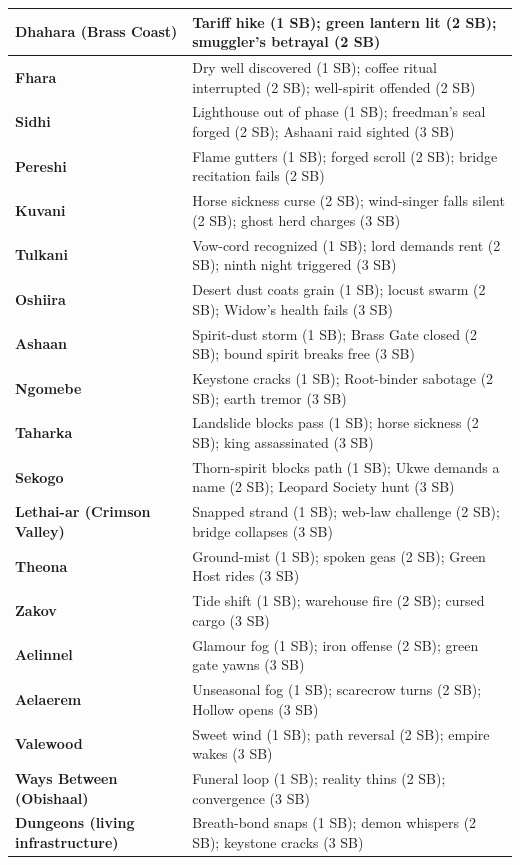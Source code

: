 \documentclass[11pt,letterpaper,twoside]{book}
\begin{document}
\begin{longtable}{|p{3cm}|p{9cm}|}
\hline
\textbf{Dhahara (Brass Coast)} & Tariff hike (1 SB); green lantern lit (2 SB); smuggler's betrayal (2 SB) \\
\hline
\textbf{Fhara} & Dry well discovered (1 SB); coffee ritual interrupted (2 SB); well-spirit offended (2 SB) \\
\hline
\textbf{Sidhi} & Lighthouse out of phase (1 SB); freedman's seal forged (2 SB); Ashaani raid sighted (3 SB) \\
\hline
\textbf{Pereshi} & Flame gutters (1 SB); forged scroll (2 SB); bridge recitation fails (2 SB) \\
\hline
\textbf{Kuvani} & Horse sickness curse (2 SB); wind-singer falls silent (2 SB); ghost herd charges (3 SB) \\
\hline
\textbf{Tulkani} & Vow-cord recognized (1 SB); lord demands rent (2 SB); ninth night triggered (3 SB) \\
\hline
\textbf{Oshiira} & Desert dust coats grain (1 SB); locust swarm (2 SB); Widow's health fails (3 SB) \\
\hline
\textbf{Ashaan} & Spirit-dust storm (1 SB); Brass Gate closed (2 SB); bound spirit breaks free (3 SB) \\
\hline
\textbf{Ngomebe} & Keystone cracks (1 SB); Root-binder sabotage (2 SB); earth tremor (3 SB) \\
\hline
\textbf{Taharka} & Landslide blocks pass (1 SB); horse sickness (2 SB); king assassinated (3 SB) \\
\hline
\textbf{Sekogo} & Thorn-spirit blocks path (1 SB); Ukwe demands a name (2 SB); Leopard Society hunt (3 SB) \\
\hline
\textbf{Lethai-ar (Crimson Valley)} & Snapped strand (1 SB); web-law challenge (2 SB); bridge collapses (3 SB) \\
\hline
\textbf{Theona} & Ground-mist (1 SB); spoken geas (2 SB); Green Host rides (3 SB) \\
\hline
\textbf{Zakov} & Tide shift (1 SB); warehouse fire (2 SB); cursed cargo (3 SB) \\
\hline
\textbf{Aelinnel} & Glamour fog (1 SB); iron offense (2 SB); green gate yawns (3 SB) \\
\hline
\textbf{Aelaerem} & Unseasonal fog (1 SB); scarecrow turns (2 SB); Hollow opens (3 SB) \\
\hline
\textbf{Valewood} & Sweet wind (1 SB); path reversal (2 SB); empire wakes (3 SB) \\
\hline
\textbf{Ways Between (Obishaal)} & Funeral loop (1 SB); reality thins (2 SB); convergence (3 SB) \\
\hline
\textbf{Dungeons (living infrastructure)} & Breath-bond snaps (1 SB); demon whispers (2 SB); keystone cracks (3 SB) \\
\hline
\end{longtable}
\end{document}
